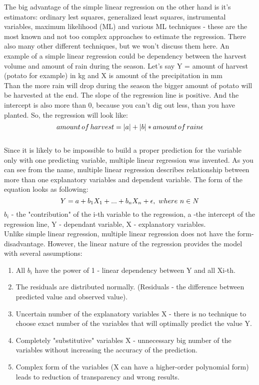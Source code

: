 \documentclass[12pt, a4paper]{article}
\begin{document}
The big advantage of the simple linear regression on the other hand is it's estimators: ordinary lest squares, generalized least squares, instrumental variables, maximum likelihood (ML) and various ML techniques - these are the most known and not too complex approaches to estimate the regression. There also many other different techniques, but we won't discuss them here. An example of a simple linear regression could be dependency between the harvest volume and amount of rain during the season. Let's say Y = amount of harvest (potato for example) in kg and X is amount of the precipitation in mm\\ Than the more rain will drop during the season the bigger amount of potato will be harvested at the end. The slope of the regression line is positive. And the intercept is also more than 0, because you can't dig out less, than you have planted. So, the regression will look like:
\[amount \thinspace of \thinspace harvest = |a| + |b|*amount \thinspace of \thinspace rain \epsilon\] \\
Since it is likely to be impossible to build a proper prediction for the variable only with one predicting variable, multiple linear regression was invented. As you can see from the name, multiple linear regression describes relationship between more than one explanatory variables and dependent variable. The form of the equation looks as following:\[ Y = a + b_{1}X_{1}+ ... + b_{n}X_{n} + \epsilon, \thinspace \thinspace where \thinspace \thinspace n \in N\]   
$b_{i}$ - the "contribution" of the i-th variable to the regression, a -the intercept of the regression line, Y - dependant variable, X - explanatory variables.\\
Unlike simple linear regression, multiple linear regression does not have the form-disadvantage. However, the linear nature of the regression provides the model with several assumptions:
\begin{enumerate}
	\item All $b_{i}$ have the power of 1 - linear dependency between Y and all Xi-th.
	\item The residuals are distributed normally. (Residuals - the difference between predicted value and observed value).
	\item Uncertain number of the explanatory variables X - there is no technique to choose exact number of the variables that will optimally predict the value Y.
	\item Completely "substitutive" variables X - unnecessary big number of the variables without increasing the accuracy of the prediction.
	\item Complex form of the variables (X can have a higher-order polynomial form) leads to reduction of transparency and wrong results. 
\end{enumerate}
\end{document}

